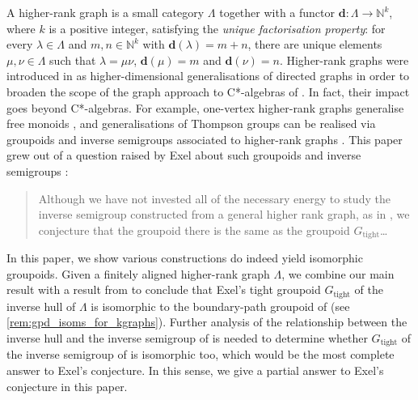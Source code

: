 \documentclass[11pt]{amsart}
\theoremstyle{definition}
\numberwithin{thm}{section}
\numberwithin{equation}{section}
\newcommand{\Define}[1]{\emph{#1}}
\newcommand{\N}{\mathbb{N}}
\newcommand{\degree}{\mathbf{d}}
\newcommand{\tightgpd}{G_\mathrm{tight}}
\begin{document}
A higher-rank graph is a small category $\Lambda$ together with a functor $\degree \colon \Lambda \to \N^k$, where $k$ is a positive integer, satisfying the \Define{unique factorisation property}: for every $\lambda \in \Lambda$ and $m, n \in \N^k$ with $\degree(\lambda) = m + n$, there are unique elements $\mu, \nu \in \Lambda$ such that $\lambda = \mu\nu$, $\degree(\mu) = m$ and $\degree(\nu) = n$.
Higher-rank graphs were introduced in \cite{KP00} as higher-dimensional generalisations of directed graphs in order to broaden the scope of the graph approach to C*-algebras of \cite{KPRR97}.
In fact, their impact goes beyond C*-algebras.
For example, one-vertex higher-rank graphs generalise free monoids \cite{LV24_free}, and generalisations of Thompson groups can be realised via groupoids and inverse semigroups associated to higher-rank graphs \cite{LV20,LSV24}.
This paper grew out of a question raised by Exel about such groupoids and inverse semigroups \cite[Page 195]{Exe08}:
\begin{quote}
Although we have not invested all of the necessary energy to study the inverse semigroup constructed from a general higher rank graph, as in \cite{FMY05}, we conjecture that the groupoid there is the same as the groupoid $\tightgpd$\dots
\end{quote}

In this paper, we show various constructions do indeed yield isomorphic groupoids. 
Given a finitely aligned higher-rank graph $\Lambda$, we combine our main result with a result from \cite{OP20} to conclude that Exel's tight groupoid $\tightgpd$ of the inverse hull of $\Lambda$ is isomorphic to the boundary-path groupoid of \cite{FMY05} (see \cref{rem:gpd_isoms_for_kgraphs}). 
Further analysis of the relationship between the inverse hull and the inverse semigroup of \cite{FMY05} is needed to determine whether $\tightgpd$ of the inverse semigroup of \cite{FMY05} is isomorphic too, which would be the most complete answer to Exel's conjecture. 
In this sense, we give a partial answer to Exel's conjecture in this paper. 
\end{document}
